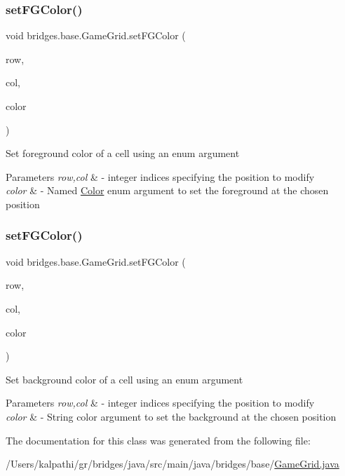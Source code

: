 \subsubsection{\texorpdfstring{setFGColor()}{setFGColor()}\hspace{0.1cm}{\footnotesize\ttfamily [1/2]}}
{\footnotesize\ttfamily void bridges.\+base.\+Game\+Grid.\+set\+F\+G\+Color (\begin{DoxyParamCaption}\item[{Integer}]{row,  }\item[{Integer}]{col,  }\item[{\mbox{\hyperlink{enumbridges_1_1base_1_1_named_color}{Named\+Color}}}]{color }\end{DoxyParamCaption})}

Set foreground color of a cell using an enum argument


\begin{DoxyParams}{Parameters}
{\em row,col} & -\/ integer indices specifying the position to modify \\
\hline
{\em color} & -\/ Named \mbox{\hyperlink{classbridges_1_1base_1_1_color}{Color}} enum argument to set the foreground at the chosen position \\
\hline
\end{DoxyParams}
\mbox{\label{classbridges_1_1base_1_1_game_grid_a860f2669ba46bc7691f4bb5c7adf907b}} 
\subsubsection{\texorpdfstring{setFGColor()}{setFGColor()}\hspace{0.1cm}{\footnotesize\ttfamily [2/2]}}
{\footnotesize\ttfamily void bridges.\+base.\+Game\+Grid.\+set\+F\+G\+Color (\begin{DoxyParamCaption}\item[{Integer}]{row,  }\item[{Integer}]{col,  }\item[{String}]{color }\end{DoxyParamCaption})}

Set background color of a cell using an enum argument


\begin{DoxyParams}{Parameters}
{\em row,col} & -\/ integer indices specifying the position to modify \\
\hline
{\em color} & -\/ String color argument to set the background at the chosen position \\
\hline
\end{DoxyParams}


The documentation for this class was generated from the following file\+:\begin{DoxyCompactItemize}
\item 
/\+Users/kalpathi/gr/bridges/java/src/main/java/bridges/base/\mbox{\hyperlink{_game_grid_8java}{Game\+Grid.\+java}}\end{DoxyCompactItemize}
